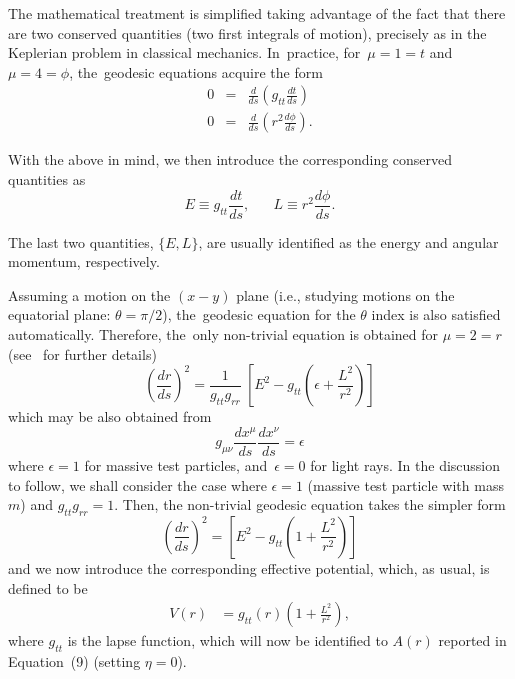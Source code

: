 \documentclass[aps,amsmath,amssymb,twocolumn]{revtex4}
\begin{document}
The mathematical treatment is simplified taking advantage of the fact that there are two conserved quantities (two first integrals of motion), precisely as in the Keplerian problem in classical mechanics. In~practice,  for~$\mu=1=t$ and $\mu=4=\phi$, the~geodesic equations acquire the form
%
\begin{eqnarray}
0 & = & \frac{d}{ds} \left( g_{tt} \frac{dt}{ds} \right) \\
0 & = & \frac{d}{ds} \left( r^2 \frac{d\phi}{ds} \right).
\end{eqnarray}
 
With the above in mind, we then introduce the corresponding conserved quantities as
\begin{equation}
E \equiv g_{tt} \frac{dt}{ds}, \; \; \; \; \; \; L \equiv r^2 \frac{d\phi}{ds}.
\end{equation}
 
The last two quantities, $\{E, L\}$, are usually identified as the energy and angular momentum, respectively.
%
%
 
Assuming a motion on the $(x-y)$ plane (i.e., studying motions on the equatorial plane: $\theta = \pi/2$), the~geodesic equation for the $\theta$ index is also satisfied automatically. Therefore, the~only non-trivial equation is obtained for $\mu=2=r$ (see~\cite{Garcia:2013zud} for further details)
%
\begin{equation}
\left( \frac{dr}{ds} \right)^2 = \frac{1}{g_{tt} g_{rr}} \: \left[ E^2 - g_{tt} \left( \epsilon + \frac{L^2}{r^2} \right) \right]
\end{equation}
%
which may be also obtained from~\cite{Garcia:2013zud}
%
\begin{equation}
g_{\mu \nu} \frac{dx^\mu}{ds} \frac{dx^\nu}{ds} = \epsilon
\end{equation}
%
where $\epsilon = 1$ for massive test particles, and~$\epsilon = 0$ for light rays.
%
In the discussion to follow, we shall consider the case where $\epsilon = 1$ (massive test particle with mass $m$)
and $g_{tt} g_{rr} = 1$. Then, the non-trivial geodesic equation takes the simpler form
\begin{equation}
\left( \frac{dr}{ds} \right)^2 = \left[ E^2 - g_{tt} \left( 1 + \frac{L^2}{r^2} \right) \right]
\end{equation}
and we now introduce the corresponding effective potential, which, as usual, is defined to be
\begin{align}
V(r) &= g_{tt}(r) \left( 1 + \frac{L^2}{r^2} \right),
\end{align}
%
where $g_{tt}$ is the lapse function, which will now be identified to $A(r)$ reported in \mbox{Equation~(9)} (setting $\eta=0$).
\end{document}
